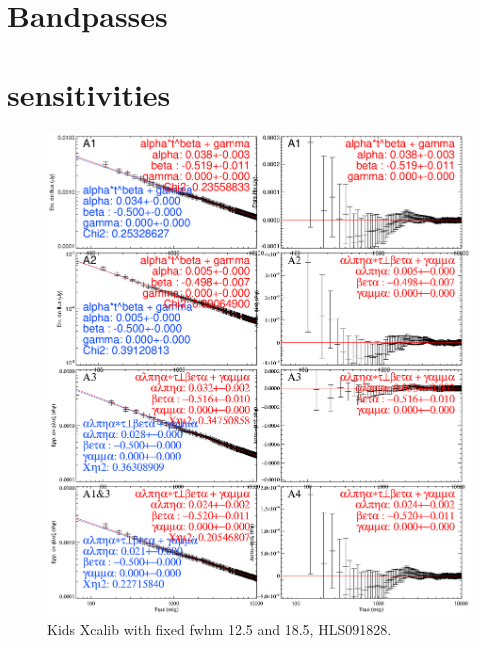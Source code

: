 \documentclass[a4paper, 11pt]{article} %
\begin{document}
 

\section{Bandpasses}


\section{sensitivities}

\begin{figure}
\begin{center}
\includegraphics[clip, angle=0, scale = 0.5]{Figures/nefd_mpfit_HLS091828.eps}
\caption{Kids Xcalib with fixed fwhm 12.5 and 18.5, HLS091828.}
\label{fig:nefd_vs_t}
\end{center}
\end{figure}
\end{document}
